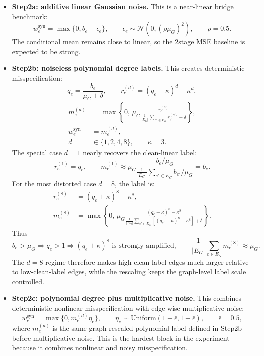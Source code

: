 \documentclass[11pt]{article}
\begin{document}
\begin{itemize}
  \item \textbf{Step2a: additive linear Gaussian noise.} This is a near-linear bridge benchmark:
  \[
    w^{\mathrm{syn}}_e = \max\{0, b_e + \epsilon_e\},
    \qquad
    \epsilon_e \sim \mathcal{N}\!\left(0,(\rho\mu_G)^2\right),
    \qquad \rho=0.5.
  \]
  The conditional mean remains close to linear, so the 2stage MSE baseline is expected to be strong.

  \item \textbf{Step2b: noiseless polynomial degree labels.} This creates deterministic misspecification:
  \[
    q_e = \frac{b_e}{\mu_G+\delta},\qquad
    r_e^{(d)} = (q_e + \kappa)^d - \kappa^d,
  \]
  \[
    \begin{aligned}
    m_e^{(d)}
    &=
    \max\left\{
      0,\,
      \mu_G
      \frac{r_e^{(d)}}{\frac{1}{|E_G|}\sum_{e'\in E_G} r_{e'}^{(d)}+\delta}
    \right\},\\
    w^{\mathrm{syn}}_e &= m_e^{(d)},\\
    d &\in \{1,2,4,8\},\qquad \kappa=3.
    \end{aligned}
  \]
  The special case \(d=1\) nearly recovers the clean-linear label:
  \[
    r_e^{(1)} = q_e,\qquad
    m_e^{(1)}
    \approx
    \mu_G
    \frac{b_e/\mu_G}{\frac{1}{|E_G|}\sum_{e'\in E_G} b_{e'}/\mu_G}
    =
    b_e.
  \]
  For the most distorted case \(d=8\), the label is:
  \[
    \begin{aligned}
    r_e^{(8)} &= (q_e+\kappa)^8-\kappa^8,\\
    m_e^{(8)}
    &=
    \max\left\{
      0,\,
      \mu_G
      \frac{(q_e+\kappa)^8-\kappa^8}
      {\frac{1}{|E_G|}\sum_{e'\in E_G}\left[(q_{e'}+\kappa)^8-\kappa^8\right]+\delta}
    \right\}.
    \end{aligned}
  \]
  Thus
  \[
    b_e>\mu_G
    \Rightarrow q_e>1
    \Rightarrow (q_e+\kappa)^8 \text{ is strongly amplified},
    \qquad
    \frac{1}{|E_G|}\sum_{e\in E_G}m_e^{(8)}\approx \mu_G.
  \]
  The \(d=8\) regime therefore makes high-clean-label edges much larger relative to low-clean-label edges, while the rescaling keeps the graph-level label scale controlled.

  \item \textbf{Step2c: polynomial degree plus multiplicative noise.} This combines deterministic nonlinear misspecification with edge-wise multiplicative noise:
  \[
    w^{\mathrm{syn}}_e = \max\{0, m_e^{(d)}\eta_e\},
    \qquad
    \eta_e \sim \mathrm{Uniform}(1-\bar\epsilon,1+\bar\epsilon),
    \qquad \bar\epsilon=0.5,
  \]
  where \(m_e^{(d)}\) is the same graph-rescaled polynomial label defined in Step2b before multiplicative noise. This is the hardest block in the experiment because it combines nonlinear and noisy misspecification.
\end{itemize}
\end{document}
